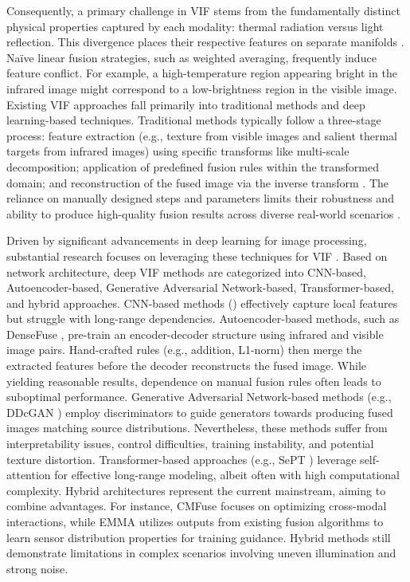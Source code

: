 \documentclass[journal]{IEEEtran}
\begin{document}
Consequently, a primary challenge in VIF stems from the fundamentally distinct physical properties captured by each modality: thermal radiation versus light reflection. This divergence places their respective features on separate manifolds \cite{luo2023infrared}. Naïve linear fusion strategies, such as weighted averaging, frequently induce feature conflict. For example, a high-temperature region appearing bright in the infrared image might correspond to a low-brightness region in the visible image.
Existing VIF approaches fall primarily into traditional methods and deep learning-based techniques. Traditional methods typically follow a three-stage process: feature extraction (e.g., texture from visible images and salient thermal targets from infrared images) using specific transforms like multi-scale decomposition; application of predefined fusion rules within the transformed domain; and reconstruction of the fused image via the inverse transform \cite{luo2023infrared}. The reliance on manually designed steps and parameters limits their robustness and ability to produce high-quality fusion results across diverse real-world scenarios \cite{lin2022review}.

Driven by significant advancements in deep learning for image processing, substantial research focuses on leveraging these techniques for VIF \cite{luo2023infrared}. Based on network architecture, deep VIF methods are categorized into CNN-based, Autoencoder-based, Generative Adversarial Network-based, Transformer-based, and hybrid approaches. CNN-based methods (\cite{Hou2020VIFNet}) effectively capture local features but struggle with long-range dependencies. Autoencoder-based methods, such as DenseFuse \cite{Hui2019DenseFuse}, pre-train an encoder-decoder structure using infrared and visible image pairs. Hand-crafted rules (e.g., addition, L1-norm) then merge the extracted features before the decoder reconstructs the fused image. While yielding reasonable results, dependence on manual fusion rules often leads to suboptimal performance. Generative Adversarial Network-based methods (e.g., DDcGAN \cite{Jiayi2020DDcGAN}) employ discriminators to guide generators towards producing fused images matching source distributions. Nevertheless, these methods suffer from interpretability issues, control difficulties, training instability, and potential texture distortion. Transformer-based approaches (e.g., SePT \cite{yang2024semantic}) leverage self-attention for effective long-range modeling, albeit often with high computational complexity. Hybrid architectures represent the current mainstream, aiming to combine advantages. For instance, CMFuse \cite{Zhao2024CMFuse} focuses on optimizing cross-modal interactions, while EMMA \cite{zhao2024equivariant} utilizes outputs from existing fusion algorithms to learn sensor distribution properties for training guidance. Hybrid methods still demonstrate limitations in complex scenarios involving uneven illumination and strong noise.
\end{document}
